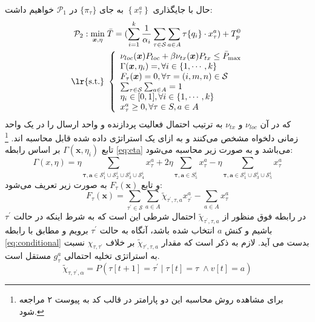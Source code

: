 حال با جایگذاری $\left\{x_{\tau}^{a}\right\}$ به جای $\{\pi_\tau\}$ در
$\mathcal{P}_{1}$
خواهیم داشت:
\begin{equation}
	\label{eq:p2}
	\begin{aligned}
		\mathcal{P}_{2}: \min _{\boldsymbol{x}, \eta}\; & \bar{T}=(\sum_{i=1}^{k} \frac{1}{\alpha_i} \sum_{\tau \in \mathcal{S}} \sum_{a \in A} \tau\{q_i\} \cdot x_{\tau}^{a})+ T_p^0 \\
		\text { \lr{s.t.} } &\left\{\begin{array}{l}
			\nu_{l o c}(\boldsymbol{x}) P_{l o c}+\beta \nu_{t x}(\boldsymbol{x}) P_{t x} \leq \bar{P}_{\max } \\
			\Gamma(\boldsymbol{x}, \eta_i)=, \forall i \in \{1, \cdots, k\}\\
			F_{\tau}(\boldsymbol{x})=0, \forall \tau=(i, m, n) \in \mathcal{S} \\
			\sum_{\tau \in \mathcal{S}} \sum_{a \in A}=1 \\
			\eta_i \in [0, 1], \forall i \in \{1, \cdots, k\} \\
			x_{\tau}^{a} \geq 0, \forall \tau \in S, a \in A
		\end{array}\right.
	\end{aligned}
\end{equation}
که در آن
$\nu_{l o c}$
و
$\nu_{t x}$
به ترتیب احتمال فعالیت پردازنده و واحد ارسال را در یک واحد زمانی دلخواه مشخص می‌کنند و به ازای یک استراتژی داده شده قابل محاسبه اند. \footnote{برای مشاهده روش محاسبه این دو پارامتر در قالب کد به پیوست ۲ مراجعه شود.} تابع
$\Gamma(\boldsymbol{x}, \eta_i)$
بر اساس رابطه \ref{eq:eta} می‌باشد و به صورت زیر محاسبه می‌شود:
\begin{equation}
	\Gamma(x, \eta) = \eta  \sum_{\boldsymbol{\tau, a} \in \mathcal{S}_{1}^i\cup\mathcal{S}_{2}^i\cup\mathcal{S}_{3}^i\cup\mathcal{S}_{4}^i} x_{\tau}^a + 2 \eta \sum_{\boldsymbol{\tau, a} \in S_5^i} x_{\tau}^a
	- \eta \sum_{\boldsymbol{\tau, a} \in \mathcal{S}_{1}^i\cup\mathcal{S}_{3}^i\cup\mathcal{S}_{5}^i} x_{\tau}^a
\end{equation}
و تابع 
$F_{\tau}(\boldsymbol{x})$
به صورت زیر تعریف می‌شود:
\begin{equation}
	F_{\tau}(\boldsymbol{x})=\sum_{\tau^{\prime} \in \mathcal{S}} \sum_{a \in A} \tilde{\chi}_{\tau^{\prime}, \tau, a} x_{\tau^{\prime}}^{a}-\sum_{a \in A} x_{\tau}^{a}
\end{equation}
در رابطه فوق منظور از
$\tilde{\chi}_{\tau^{\prime}, \tau, a}$
احتمال شرطی این است که به شرط اینکه در حالت
$\tau^{\prime}$
باشیم و کنش
$a$
انتخاب شده باشد، آنگاه به حالت
$\tau^{\prime}$
برویم و مطابق با رابطه \ref{eq:conditional} بدست می آید. لازم به ذکر است که مقدار 
$ \tilde{\chi}_{\tau^{\prime}, \tau, a}$ 
بر خلاف 
$\chi_{\tau, \tau^{\prime}}$
نسبت به استراتژی تخلیه احتمالی $g_\tau^a$ مستقل است.
\begin{equation}
	\label{eq:conditional}
	\tilde{\chi}_{\tau, \tau^{\prime}, \alpha}=P\left(\tau[t+1]=\tau^{\prime} \mid \tau[t]=\tau \; \land v[t]=a\right)
\end{equation}

